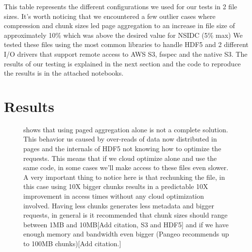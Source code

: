 \documentclass[
]{agujournal2019}
\begin{document}
This table represents the different configurations we used for our tests
in 2 file sizes. It's worth noticing that we encountered a few outlier
cases where compression and chunk sizes led page aggregation to an
increase in file size of approximately 10\% which was above the desired
value for NSIDC (5\% max) We tested these files using the most common
libraries to handle HDF5 and 2 different I/O drivers that support remote
access to AWS S3, fsspec and the native S3. The results of our testing
is explained in the next section and the code to reproduce the results
is in the attached notebooks.

\section{Results}\label{results}

\begin{figure}


\caption{\label{fig-4}shows that using paged aggregation alone is not a
complete solution. This behavior us caused by over-reads of data now
distributed in pages and the internals of HDF5 not knowing how to
optimize the requests. This means that if we cloud optimize alone and
use the same code, in some cases we'll make access to these files even
slower. A very important thing to notice here is that rechunking the
file, in this case using 10X bigger chunks results in a predictable 10X
improvement in access times without any cloud optimization involved.
Having less chunks generates less metadata and bigger requests, in
general is it recommended that chunk sizes should range between 1MB and
10MB{[}Add citation, S3 and HDF5{]} and if we have enough memory and
bandwidth even bigger (Pangeo recommends up to 100MB chunks){[}Add
citation.{]}}

\end{figure}%
\end{document}
